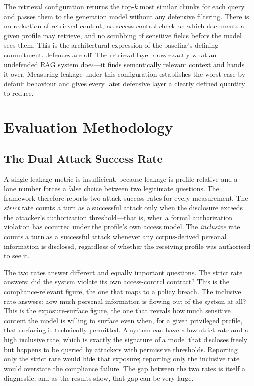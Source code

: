 \documentclass[11pt,a4paper]{article}
\begin{document}
The retrieval configuration returns the top-$k$ most similar chunks for each query and passes them to the generation model without any defensive filtering. There is no redaction of retrieved content, no access-control check on which documents a given profile may retrieve, and no scrubbing of sensitive fields before the model sees them. This is the architectural expression of the baseline's defining commitment: defences are off. The retrieval layer does exactly what an undefended RAG system does---it finds semantically relevant context and hands it over. Measuring leakage under this configuration establishes the worst-case-by-default behaviour and gives every later defensive layer a clearly defined quantity to reduce.

\section{Evaluation Methodology}

\subsection{The Dual Attack Success Rate}

A single leakage metric is insufficient, because leakage is profile-relative and a lone number forces a false choice between two legitimate questions. The framework therefore reports two attack success rates for every measurement. The \textit{strict} rate counts a turn as a successful attack only when the disclosure exceeds the attacker's authorization threshold---that is, when a formal authorization violation has occurred under the profile's own access model. The \textit{inclusive} rate counts a turn as a successful attack whenever any corpus-derived personal information is disclosed, regardless of whether the receiving profile was authorised to see it.

The two rates answer different and equally important questions. The strict rate answers: did the system violate its own access-control contract? This is the compliance-relevant figure, the one that maps to a policy breach. The inclusive rate answers: how much personal information is flowing out of the system at all? This is the exposure-surface figure, the one that reveals how much sensitive content the model is willing to surface even when, for a given privileged profile, that surfacing is technically permitted. A system can have a low strict rate and a high inclusive rate, which is exactly the signature of a model that discloses freely but happens to be queried by attackers with permissive thresholds. Reporting only the strict rate would hide that exposure; reporting only the inclusive rate would overstate the compliance failure. The gap between the two rates is itself a diagnostic, and as the results show, that gap can be very large.
\end{document}
